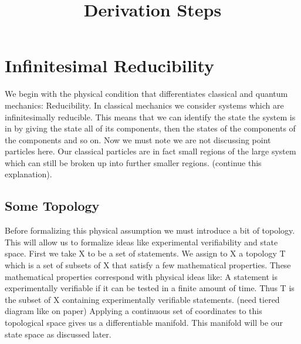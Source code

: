 \documentclass{article}
\begin{document}
\title{Derivation Steps}

\section{Infinitesimal Reducibility}

	We begin with the physical condition that differentiates classical and quantum mechanics: Reducibility. In classical mechanics we consider systems which are infinitesimally reducible. This means that we can identify the state the system is in by giving the state all of its components, then the states of the components of the components and so on. Now we must note we are not discussing point particles here. Our classical particles are in fact small regions of the large system which can still be broken up into further smaller regions. (continue this explanation). 
\subsection{Some Topology}
	Before formalizing this physical assumption we must introduce a bit of topology. This will allow us to formalize ideas like experimental verifiability and state space. First we take X to be a set of statements. We assign to X a topology T which is a set of subsets of X that satisfy a few mathematical properties. These mathematical properties correspond with physical ideas like: A statement is experimentally verifiable if it can be tested in a finite amount of time. Thus T is the subset of X containing experimentally verifiable statements. (need tiered diagram like on paper) Applying a continuous set of coordinates to this topological space gives us a differentiable manifold. This manifold will be our state space as discussed later.
\end{document}
